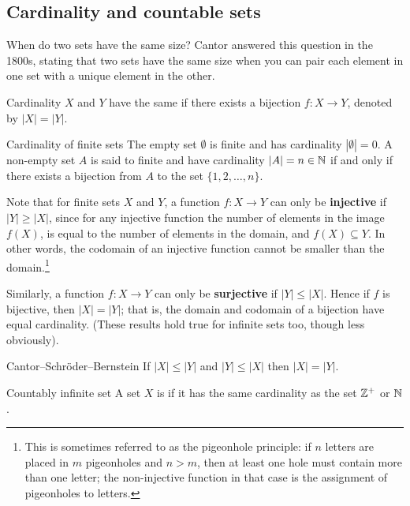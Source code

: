 \subsection{Cardinality and countable sets}
When do two sets have the same size? Cantor answered this question in the 1800s, stating that two sets have the same size when you can pair each element in one set with a unique element in the other.

\begin{defn}{Cardinality}{}
$X$ and $Y$ have the same  if there exists a bijection $f:X\to Y$, denoted by $|X| = |Y|$.
\end{defn}

\begin{defn}{Cardinality of finite sets}{}
The empty set $\emptyset$ is finite and has cardinality $|\emptyset| = 0$. A non-empty set $A$ is said to finite and have cardinality $|A| = n \in \mathbb N$ if and only if there exists a bijection from $A$ to the set $\{1,2,\dots,n\}$.
\end{defn}

\begin{remark}
Note that for finite sets $X$ and $Y$, a function $f:X \to Y$ can only be \textbf{injective} if $|Y| \ge |X|$, since for any injective function the number of elements in the image $f(X)$, is equal to the number of elements in the domain, and $f(X) \subseteq Y$. In other words, the codomain of an injective function cannot be smaller than the domain.\footnote{This is sometimes referred to as the pigeonhole principle: if $n$ letters are placed in $m$ pigeonholes and $n > m$, then at least one hole must contain more than one letter; the non-injective function in that case is the assignment of pigeonholes to letters.}

Similarly, a function $f:X \to Y$ can only be \textbf{surjective} if $|Y| \le |X|$. Hence if $f$ is bijective, then $|X|=|Y|$; that is, the domain and codomain of a bijection have equal cardinality. (These results hold true for infinite sets too, though less obviously).
\end{remark}

\begin{thrm}{Cantor--Schr\"{o}der--Bernstein}{}
If $|X| \le |Y|$ and $|Y| \le |X|$ then $|X| = |Y|$.
\end{thrm}

\begin{defn}{Countably infinite set}{}
A set $X$ is  if it has the same cardinality as the set $\mathbb Z^{+}$ or $\mathbb N$.
\end{defn}

